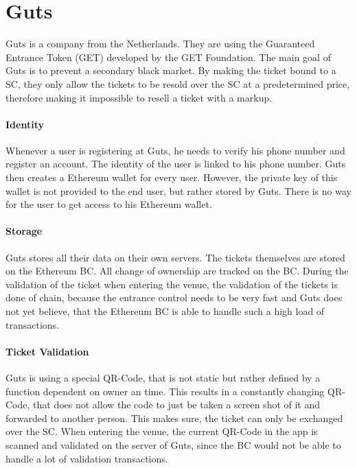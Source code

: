 
\section{Guts}
Guts \cite{GET_PROTOCOL} is a company from the Netherlands. They are using the Guaranteed Entrance Token (GET) developed by the GET Foundation. The main goal of Guts is to prevent a secondary black market. By making the ticket bound to a SC, they only allow the tickets to be resold over the SC at a predetermined price, therefore making it impossible to resell a ticket with a markup.

\paragraph{Identity}
Whenever a user is registering at Guts, he needs to verify his phone number and register an account. The identity of the user is linked to his phone number. Guts then creates a Ethereum wallet for every user. However, the private key of this wallet is not provided to the end user, but rather stored by Guts. There is no way for the user to get access to his Ethereum wallet.


\paragraph{Storage}
Guts stores all their data on their own servers. The tickets themselves are stored on the Ethereum BC. All change of ownership are tracked on the BC. During the validation of the ticket when entering the venue, the validation of the tickets is done of chain, because the entrance control needs to be very fast and Guts does not yet believe, that the Ethereum BC is able to handle such a high load of transactions.

\paragraph{Ticket Validation}
Guts is using a special QR-Code, that is not static but rather defined by a function dependent on owner an time. This results in a constantly changing QR-Code, that does not allow the code to just be taken a screen shot of it and forwarded to another person. This makes sure, the ticket can only be exchanged over the SC. When entering the venue, the current QR-Code in the app is scanned and validated on the server of Guts, since the BC would not be able to handle a lot of validation transactions.


